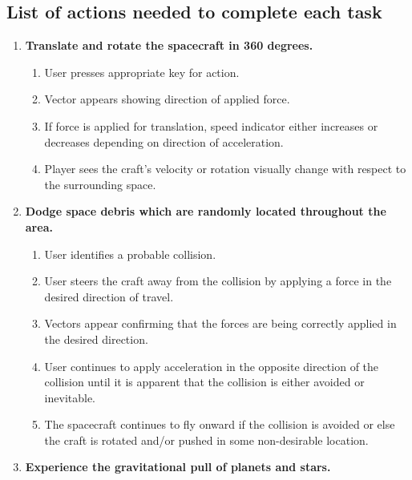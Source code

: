\subsection*{List of actions needed to complete each task}
\begin{enumerate}

\item\textbf{Translate and rotate the spacecraft in 360 degrees.}
\begin{enumerate}

  \item User presses appropriate key for action.

  \item Vector appears showing direction of applied force.

  \item If force is applied for translation, speed indicator either increases or decreases depending on direction of acceleration.

  \item Player sees the craft's velocity or rotation visually change with respect to the surrounding space.

\end{enumerate}

\item\textbf{Dodge space debris which are randomly located throughout the area.}
\begin{enumerate}

  \item User identifies a probable collision.

  \item User steers the craft away from the collision by applying a force in the desired direction of travel.

  \item Vectors appear confirming that the forces are being correctly applied in the desired direction.

  \item User continues to apply acceleration in the opposite direction of the collision until it is apparent that the collision is either avoided or inevitable.

  \item The spacecraft continues to fly onward if the collision is avoided or else the craft is rotated and/or pushed in some non-desirable location.

\end{enumerate}

\item\textbf{Experience the gravitational pull of planets and stars.}
\begin{enumerate}


\end{enumerate}
\end{enumerate}
